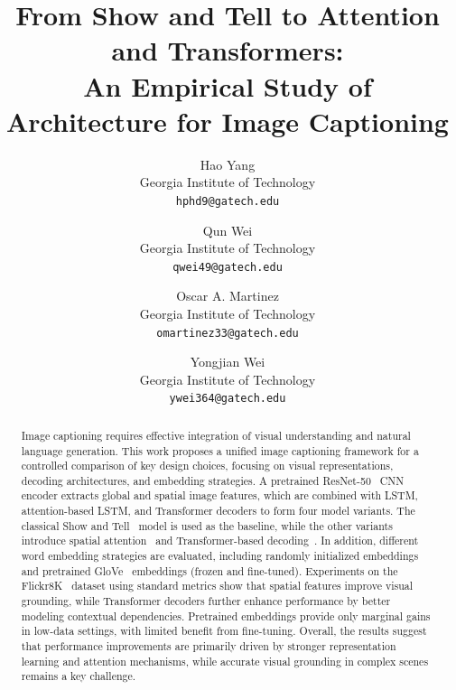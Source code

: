 \documentclass[10pt,twocolumn,letterpaper]{article}
\begin{document}
\title{From Show and Tell to Attention and Transformers:\\
An Empirical Study of Architecture for Image Captioning}

\author{Hao Yang\\
Georgia Institute of Technology\\
{\tt\small hphd9@gatech.edu}
\and
Qun Wei\\
Georgia Institute of Technology\\
{\tt\small qwei49@gatech.edu}
\and
Oscar A. Martinez\\
Georgia Institute of Technology\\
{\tt\small omartinez33@gatech.edu}
\and
Yongjian Wei\\
Georgia Institute of Technology\\
{\tt\small ywei364@gatech.edu}
}

\maketitle

\begin{abstract}
   Image captioning requires effective integration of visual
   understanding and natural language generation. This work proposes
   a unified image captioning framework for a controlled comparison
   of key design choices, focusing on visual representations,
   decoding architectures, and embedding strategies. A pretrained
   ResNet-50~\cite{he2016deep} CNN encoder extracts global and
   spatial image features, which are combined with LSTM,
   attention-based LSTM, and Transformer decoders to form four model
   variants. The classical Show and Tell~\cite{vinyals2015show} model
   is used as the baseline, while the other variants introduce
   spatial attention~\cite{xu2015show} and Transformer-based
   decoding~\cite{vaswani2017attention}. In addition, different word
   embedding strategies are evaluated, including randomly initialized
   embeddings and pretrained GloVe~\cite{pennington2014glove}
   embeddings (frozen and fine-tuned).
   Experiments on the Flickr8K~\cite{hodosh2013framing} dataset using
   standard metrics show that spatial
   features improve visual grounding, while Transformer decoders
   further enhance performance by better modeling contextual
   dependencies. Pretrained embeddings provide only marginal gains in
   low-data settings, with limited benefit from fine-tuning. Overall,
   the results suggest that performance improvements are primarily
   driven by stronger representation learning and attention
   mechanisms, while accurate visual grounding in complex scenes
   remains a key challenge.
\end{abstract}
\end{document}
